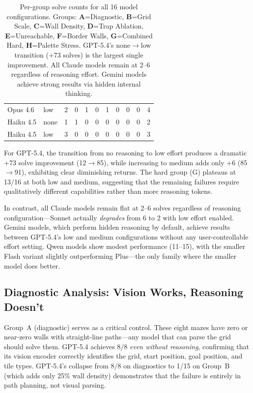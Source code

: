 \documentclass[11pt]{article}
\begin{document}
\begin{table}[t]
\begin{tabular}{@{}ll rrrrrrrr r@{}}
Opus 4.6         & low     & 2 &  0 &  1 &  0 &  1 & 0 &  0 &  0 &  4 \\
Haiku 4.5        & none    & 1 &  1 &  0 &  0 &  0 & 0 &  0 &  0 &  2 \\
Haiku 4.5        & low     & 3 &  0 &  0 &  0 &  0 & 0 &  0 &  0 &  3 \\
\bottomrule
\end{tabular}
\caption{Per-group solve counts for all 16 model configurations. Groups: \textbf{A}=Diagnostic, \textbf{B}=Grid Scale, \textbf{C}=Wall Density, \textbf{D}=Trap Ablation, \textbf{E}=Unreachable, \textbf{F}=Border Walls, \textbf{G}=Combined Hard, \textbf{H}=Palette Stress. GPT-5.4's none$\to$low transition (+73 solves) is the largest single improvement. All Claude models remain at 2--6 regardless of reasoning effort. Gemini models achieve strong results via hidden internal thinking.}
\label{tab:scaling}
\end{table}

For GPT-5.4, the transition from no reasoning to low effort produces a dramatic +73 solve improvement (12$\to$85), while increasing to medium adds only +6 (85$\to$91), exhibiting clear diminishing returns.
The hard group (G) plateaus at 13/16 at both low and medium, suggesting that the remaining failures require qualitatively different capabilities rather than more reasoning tokens.

In contrast, all Claude models remain flat at 2--6 solves regardless of reasoning configuration---Sonnet actually \emph{degrades} from 6 to 2 with low effort enabled.
Gemini models, which perform hidden reasoning by default, achieve results between GPT-5.4's low and medium configurations without any user-controllable effort setting.
Qwen models show modest performance (11--15), with the smaller Flash variant slightly outperforming Plus---the only family where the smaller model does better.

\subsection{Diagnostic Analysis: Vision Works, Reasoning Doesn't}
\label{sec:diagnostic}

Group~A (diagnostic) serves as a critical control.
These eight mazes have zero or near-zero walls with straight-line paths---any model that can parse the grid should solve them.
GPT-5.4 achieves 8/8 \emph{even without reasoning}, confirming that its vision encoder correctly identifies the grid, start position, goal position, and tile types.
GPT-5.4's collapse from 8/8 on diagnostics to 1/15 on Group~B (which adds only 25\% wall density) demonstrates that the failure is entirely in path planning, not visual parsing.
\end{document}
